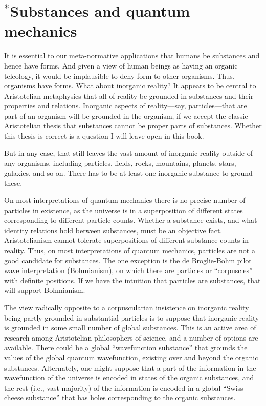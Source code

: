 \section{$^*$Substances and quantum mechanics}
It is essential to our meta-normative applications that humans be substances and hence have forms. And given a view of 
human beings as having an organic teleology, it would be implausible to deny form to other organisms. Thus, organisms
have forms. What about inorganic reality? It appears to be central to Aristotelian metaphysics that all of reality be 
grounded in substances and their properties and relations. Inorganic aspects of reality---say, particles---that are 
part of an organism will be grounded in the organism, if we accept the classic Aristotelian thesis that substances 
cannot be proper parts of substances. Whether this thesis is correct is a question I will leave open in this book.

But in any case, that still leaves the vast amount of inorganic reality outside of any organisms, including particles, 
fields, rocks, mountains, planets, stars, galaxies, and so on. There has to be at least one inorganic substance to ground these.

On most interpretations of quantum mechanics there is no precise number of particles
in existence, as the universe is in a superposition of different states corresponding to different particle counts. Whether 
a substance exists, and what identity relations hold between substances, must be an objective fact. Aristotelianism cannot 
tolerate superpositions of different substance counts in reality. Thus, on most interpretations of quantum mechanics, particles
are not a good candidate for substances. The one exception is the de Broglie-Bohm pilot wave interpretation (Bohmianism), on 
which there are particles or ``corpuscles'' with definite positions. If we have the intuition that particles are substances, 
that will support Bohmianism. 

The view radically opposite to a corpuscularian insistence on inorganic reality being partly grounded in substantial 
particles is to suppose that inorganic reality is grounded in some small number of global substances. This is an 
active area of research among Aristotelian philosophers of science, and a number of options are available. There 
could be a global ``wavefunction substance'' that grounds the values of the global quantum wavefunction, existing
over and beyond the organic substances. Alternately, one might suppose that a part of the information in the 
wavefunction of the universe is encoded in states of the organic substances, and the rest (i.e., vast majority) of 
the information is encoded in a global ``Swiss cheese substance'' that has holes corresponding to the organic substances. 

